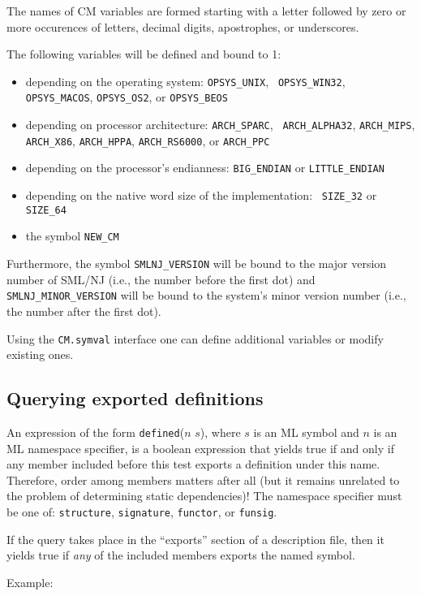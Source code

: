 \documentclass[titlepage,letterpaper]{article}
\begin{document}
The names of CM variables are formed starting with a letter followed
by zero or more occurences of letters, decimal digits, apostrophes, or
underscores.

The following variables will be defined and bound to 1:
\begin{itemize}
\item depending on the operating system: {\tt OPSYS\_UNIX}, {\tt
OPSYS\_WIN32}, {\tt OPSYS\_MACOS}, {\tt OPSYS\_OS2}, or \linebreak
{\tt OPSYS\_BEOS}
\item depending on processor architecture: {\tt ARCH\_SPARC}, {\tt
ARCH\_ALPHA32}, {\tt ARCH\_MIPS}, {\tt ARCH\_X86}, {\tt ARCH\_HPPA},
{\tt ARCH\_RS6000}, or {\tt ARCH\_PPC}
\item depending on the processor's endianness: {\tt BIG\_ENDIAN} or
{\tt LITTLE\_ENDIAN}
\item depending on the native word size of the implementation: {\tt
SIZE\_32} or {\tt SIZE\_64}
\item the symbol {\tt NEW\_CM}
\end{itemize}

Furthermore, the symbol {\tt SMLNJ\_VERSION} will be bound to the
major version number of SML/NJ (i.e., the number before the first dot)
and {\tt SMLNJ\_MINOR\_VERSION} will be bound to the system's minor
version number (i.e., the number after the first dot).

Using the {\tt CM.symval} interface one can define additional
variables or modify existing ones.

\subsection{Querying exported definitions}

An expression of the form {\tt defined}($n$ $s$), where $s$ is an ML
symbol and $n$ is an ML namespace specifier, is a boolean expression
that yields true if and only if any member included before this test
exports a definition under this name.  Therefore, order among members
matters after all (but it remains unrelated to the problem of
determining static dependencies)!  The namespace specifier must be one
of: {\tt structure}, {\tt signature}, {\tt functor}, or {\tt funsig}.

If the query takes place in the ``exports'' section of a description
file, then it yields true if {\em any} of the included members exports
the named symbol.

\noindent Example:
\end{document}
